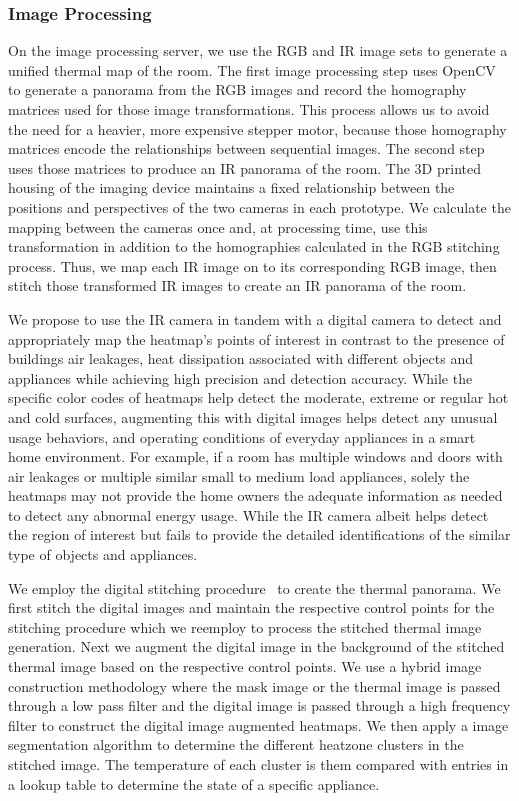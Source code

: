 \subsubsection{\textbf{Image Processing}}
 \indent On the image processing server, we use the RGB and IR image sets to generate a unified thermal map of the room. The first image processing step uses OpenCV to generate a panorama from the RGB images and record the homography matrices used for those image transformations. This process allows us to avoid the need for a heavier, more expensive stepper motor, because those homography matrices encode the relationships between sequential images. The second step uses those  matrices to produce an IR panorama of the room. The 3D printed housing of the imaging device maintains a fixed relationship between the positions and perspectives of the two cameras in each prototype. We calculate the mapping between the cameras once and, at processing time, use this transformation in addition to the homographies calculated in the RGB stitching process. Thus, we map each IR image on to its corresponding RGB image, then stitch those transformed IR images to create an IR panorama of the room.

\indent We propose to use the IR camera in tandem with a digital camera to detect and appropriately map the heatmap's points of interest in contrast to the presence of buildings air leakages, heat dissipation associated with different objects and appliances while achieving high precision and detection accuracy. While the specific color codes of heatmaps help detect the moderate, extreme or regular hot and cold surfaces, augmenting this with digital images helps detect any unusual usage behaviors, and operating conditions of everyday appliances in a smart home environment. For example, if a room has multiple windows and doors with air leakages or multiple similar small to medium load appliances, solely the heatmaps may not provide the home owners the adequate information as needed to detect any abnormal energy usage. While the IR camera albeit helps detect the region of interest but fails to provide the detailed identifications of the similar type of objects and appliances.

 
\indent We employ the digital stitching procedure~\cite{Stitch} to create the thermal panorama. We first stitch the digital images and maintain the respective control points for the stitching procedure which we reemploy to process the stitched thermal image generation. Next we augment the digital image in the background of the stitched thermal image based on the respective control points. We use a hybrid image construction methodology where the mask image or the thermal image is passed through a low pass filter and the digital image is passed through a high frequency filter to construct the digital image augmented heatmaps. We then apply a image segmentation algorithm to determine the different heatzone clusters in the stitched image. The temperature of each cluster is them compared with entries in a lookup table to determine the state of a specific appliance.  
 
